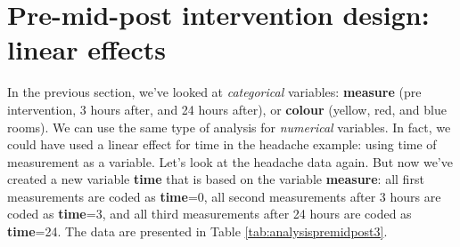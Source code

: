 \documentclass[]{book}\usepackage[]{graphicx}\usepackage[]{color}
\begin{document}
% 
% 
% 
% 
% 
% 
% 
% 
% 


\section{Pre-mid-post intervention design: linear effects}
In the previous section, we've looked at \textit{categorical} variables: \textbf{measure} (pre intervention, 3 hours after, and 24 hours after), or \textbf{colour} (yellow, red, and blue rooms). We can use the same type of analysis for \textit{numerical} variables. In fact, we could have used a linear effect for time in the headache example: using time of measurement as a variable. Let's look at the headache data again. But now we've created a new variable \textbf{time} that is based on the variable \textbf{measure}: all first measurements are coded as \textbf{time}=0, all second measurements after 3 hours are coded as \textbf{time}=3, and all third measurements after 24 hours are coded as \textbf{time}=24. The data are presented in Table \ref{tab:analysispremidpost3}.
\end{document}
